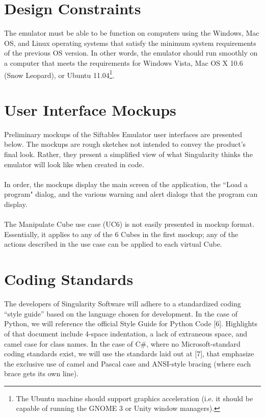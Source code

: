 \documentclass[12pt]{article}
\begin{document}
\section{Design Constraints}
The emulator must be able to be function on computers using the \gls{Windows}, \gls{Mac} OS, and \gls{Linux} operating systems that satisfy the minimum system requirements of the previous OS version. In other words, the emulator should run smoothly on a computer that meets the requirements for \gls{Windows} Vista, \gls{Mac} OS X 10.6 (Snow Leopard), or Ubuntu 11.04\footnote{The Ubuntu machine should support graphics acceleration (i.e. it should be capable of running the GNOME 3 or Unity window managers).}.

\section{User Interface Mockups}
Preliminary mockups of the Siftables Emulator user interfaces are presented below. The mockups are rough sketches not intended to convey the product's final look. Rather, they present a simplified view of what Singularity thinks the emulator will look like when created in code.\\\\
In order, the mockups display the main screen of the application, the ``Load a program" dialog, and the various warning and alert dialogs that the program can display.\\\\
The Manipulate Cube use case (UC6) is not easily presented in mockup format. Essentially, it applies to any of the 6 Cubes in the first mockup; any of the actions described in the use case can be applied to each virtual Cube.



\section{Coding Standards}
The developers of Singularity Software will adhere to a standardized coding ``style guide'' based on the language chosen for development. In the case of Python, we will reference the official Style Guide for Python Code [6]. Highlights of that document include 4-space indentation, a lack of extraneous space,  and camel case for class names. In the case of C\#, where no Microsoft-standard coding standards exist, we will use the standards laid out at [7], that emphasize the exclusive use of camel and Pascal case and ANSI-style bracing (where each brace gets its own line).
\end{document}
